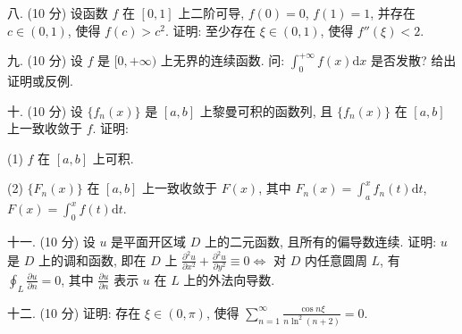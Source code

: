 \documentclass{examcollection}
\begin{document}
{\begin{minipage}{\textwidth}
八. (10 分) 设函数 $f$ 在 $[0,1]$ 上二阶可导, $f(0) = 0$, $f(1) = 1$, 并存在 $c \in (0,1)$, 使得 $f(c) > c^2$. 证明: 至少存在 $\xi \in (0,1)$, 使得 $f''(\xi) < 2$.\par
九. (10 分) 设 $f$ 是 $[0, +\infty)$ 上无界的连续函数. 问: $\int_0^{+\infty} f(x) \mathrm{d}x$ 是否发散? 给出证明或反例.\par
十. (10 分) 设 $\{f_n(x)\}$ 是 $[a, b]$ 上黎曼可积的函数列, 且 $\{f_n(x)\}$ 在 $[a, b]$ 上一致收敛于 $f$. 证明:\par
(1) $f$ 在 $[a, b]$ 上可积.\par
(2) $\{F_n(x)\}$ 在 $[a, b]$ 上一致收敛于 $F(x)$, 其中 $F_n(x) = \int_{a}^{x} f_n(t) \mathrm{d}t$, $F(x) = \int_{0}^{x} f(t) \mathrm{d}t$.\par
十一. (10 分) 设 $u$ 是平面开区域 $D$ 上的二元函数, 且所有的偏导数连续. 证明: $u$ 是 $D$ 上的调和函数, 即在 $D$ 上 $\frac{\partial^2 u}{\partial x^2} + \frac{\partial^2 u}{\partial y^2} \equiv 0 \Longleftrightarrow$ 对 $D$ 内任意圆周 $L$, 有 $\oint_L \frac{\partial u}{\partial n} = 0$, 其中 $\frac{\partial u}{\partial n}$ 表示 $u$ 在 $L$ 上的外法向导数.\par
十二. (10 分) 证明: 存在 $\xi \in (0, \pi)$, 使得 $\sum_{n=1}^{\infty} \frac{\cos n\xi}{n \ln^{2}(n+2)} = 0$.\par
\end{minipage}}
\ifdim\dimexpr\ht\proofbox+\dp\proofbox\relax>\textheight
\noindent\resizebox{!}{\textheight}{\usebox{\proofbox}}\else\noindent\usebox{\proofbox}\fi\clearpage
\end{document}
